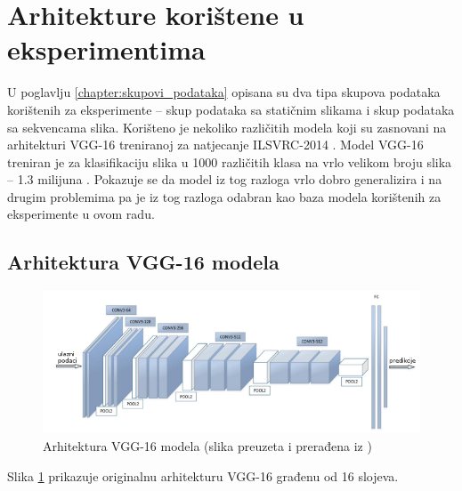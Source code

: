 \documentclass[times, utf8, diplomski, numeric]{fer}
\begin{document}
\section{Arhitekture korištene u eksperimentima}
U poglavlju \ref{chapter:skupovi_podataka} opisana su dva tipa skupova podataka korištenih za eksperimente -- skup podataka sa statičnim slikama i skup podataka sa sekvencama slika.
Korišteno je nekoliko različitih modela koji su zasnovani na arhitekturi VGG-16 \citep{article:vgg} treniranoj za natjecanje ILSVRC-2014 \citep{article:ilsvrc2015}.
Model VGG-16 treniran je za klasifikaciju slika u 1000 različitih klasa na vrlo velikom broju slika -- 1.3 milijuna \citep{article:vgg}.
Pokazuje se da model iz tog razloga vrlo dobro generalizira i na drugim problemima \citep{article:vgg} pa je iz tog razloga odabran kao baza modela korištenih za eksperimente u ovom radu.

\subsection{Arhitektura VGG-16 modela}
\begin{figure}[H]
\centering
\includegraphics[scale=0.65]{images/vgg_architecture.png}
\caption{Arhitektura VGG-16 modela (slika preuzeta i prerađena iz \citep{article:vgg_architecture})}
\label{img:vgg_architecture}
\end{figure}
Slika \ref{img:vgg_architecture} prikazuje originalnu arhitekturu VGG-16 građenu od 16 slojeva.
\end{document}
